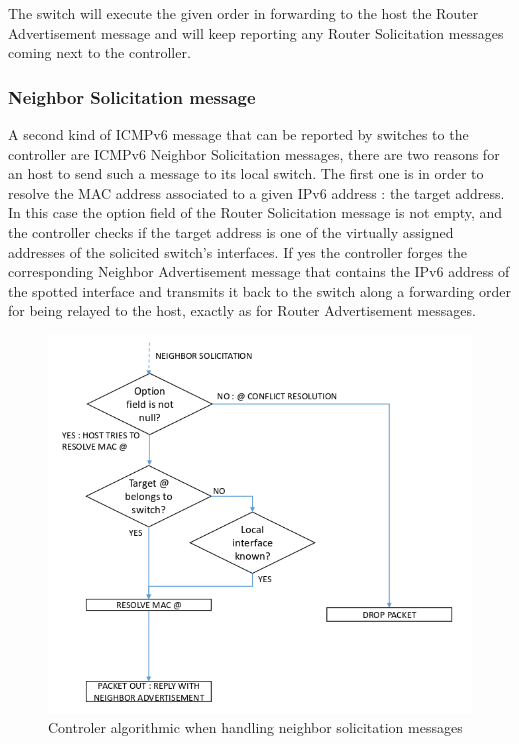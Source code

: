 \documentclass{article}
\begin{document}
The switch will execute the given order in forwarding to the host the
Router Advertisement message and will keep reporting any Router
Solicitation messages coming next to the controller.\\

\subsubsection{Neighbor Solicitation message}

A second kind of ICMPv6 message that can be reported by switches to
the controller are ICMPv6 Neighbor Solicitation messages, there are
two reasons for an host to send such a message to its local switch. The
first one is in order to resolve the MAC address associated to a given
IPv6 address : the target address. In this case the option field of
the Router Solicitation message is not empty, and the controller
checks if the target address is one of the virtually assigned
addresses of the solicited switch's interfaces. If yes the controller
forges the corresponding Neighbor Advertisement message that contains
the IPv6 address of the spotted interface and transmits it back to the
switch along a forwarding order for being relayed to the host, exactly
as for Router Advertisement messages.\\

\begin{figure}[h!]
  \centering
    \includegraphics[scale=0.3]{reportPictures/neighbor_solicitation.png}
  \caption{Controler algorithmic when handling neighbor solicitation messages}
\end{figure}
\end{document}
